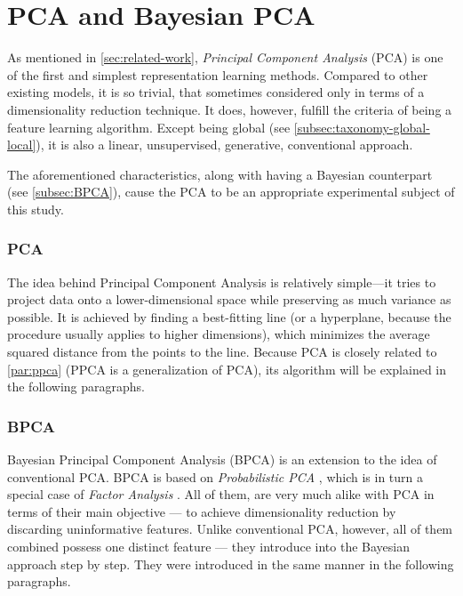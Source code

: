 \section{PCA and Bayesian PCA}
As mentioned in \autoref{sec:related-work}, \textit{Principal Component Analysis} (PCA) is one of the first and simplest representation learning methods. Compared to other existing models, it is so trivial, that sometimes considered only in terms of a dimensionality reduction technique. It does, however, fulfill the criteria of being a feature learning algorithm. Except being global (see \autoref{subsec:taxonomy-global-local}), it is also a linear, unsupervised, generative, conventional approach. 

\vspace{\baselineskip}
The aforementioned characteristics, along with having a Bayesian counterpart (see \autoref{subsec:BPCA}), cause the PCA to be an appropriate experimental subject of this study.

\subsubsection{PCA}
The idea behind Principal Component Analysis is relatively simple—it tries to project data onto a lower-dimensional space while preserving as much variance as possible. It is achieved by finding a best-fitting line (or a hyperplane, because the procedure usually applies to higher dimensions), which minimizes the average squared distance from the points to the line. Because PCA is closely related to \autoref{par:ppca} (PPCA is a generalization of PCA), its algorithm will be explained in the following paragraphs.

\subsubsection{BPCA}
\label{subsec:BPCA}
Bayesian Principal Component Analysis (BPCA) \cite{Bishop1998} is an extension to the idea of conventional PCA. BPCA is based on \textit{Probabilistic PCA} \cite{Tipping1999}\cite{Roweis1997}, which is in turn a special case of \textit{Factor Analysis} \cite{Fruchter1954}. All of them, are very much alike with PCA in terms of their main objective — to achieve dimensionality reduction by discarding uninformative features. Unlike conventional PCA, however, all of them combined possess one distinct feature — they introduce into the Bayesian approach step by step. They were introduced in the same manner in the following paragraphs.


